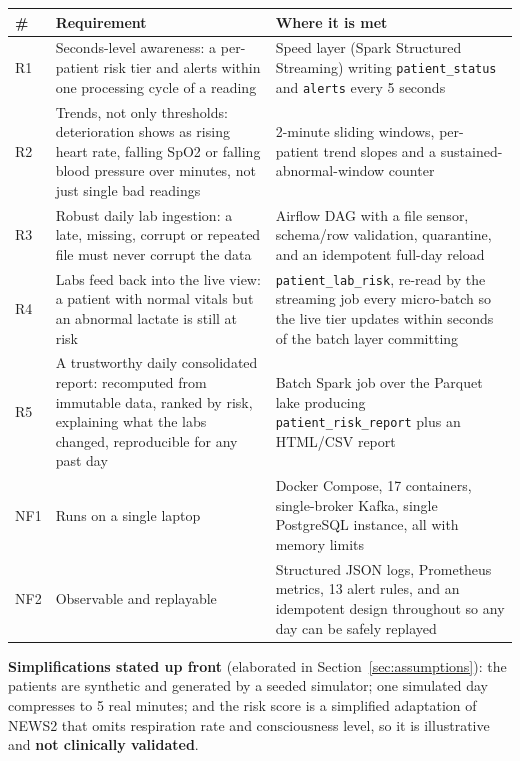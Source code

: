 \documentclass[11pt,a4paper]{article}
\newcommand{\code}[1]{\texttt{\small #1}}
\begin{document}
\begin{longtable}{@{}L{1.2cm}L{6cm}L{7.5cm}@{}}
\toprule
\textbf{\#} & \textbf{Requirement} & \textbf{Where it is met} \\
\midrule
\endhead
R1 & Seconds-level awareness: a per-patient risk tier and alerts within one processing cycle of a reading &
Speed layer (Spark Structured Streaming) writing \code{patient\_status} and \code{alerts} every 5 seconds \\
R2 & Trends, not only thresholds: deterioration shows as rising heart rate, falling SpO2 or falling blood pressure over minutes, not just single bad readings &
2-minute sliding windows, per-patient trend slopes and a sustained-abnormal-window counter \\
R3 & Robust daily lab ingestion: a late, missing, corrupt or repeated file must never corrupt the data &
Airflow DAG with a file sensor, schema/row validation, quarantine, and an idempotent full-day reload \\
R4 & Labs feed back into the live view: a patient with normal vitals but an abnormal lactate is still at risk &
\code{patient\_lab\_risk}, re-read by the streaming job every micro-batch so the live tier updates within seconds of the batch layer committing \\
R5 & A trustworthy daily consolidated report: recomputed from immutable data, ranked by risk, explaining what the labs changed, reproducible for any past day &
Batch Spark job over the Parquet lake producing \code{patient\_risk\_report} plus an HTML/CSV report \\
NF1 & Runs on a single laptop &
Docker Compose, 17 containers, single-broker Kafka, single PostgreSQL instance, all with memory limits \\
NF2 & Observable and replayable &
Structured JSON logs, Prometheus metrics, 13 alert rules, and an idempotent design throughout so any day can be safely replayed \\
\bottomrule
\end{longtable}

\textbf{Simplifications stated up front} (elaborated in Section~\ref{sec:assumptions}): the patients
are synthetic and generated by a seeded simulator; one simulated day compresses to 5 real minutes;
and the risk score is a simplified adaptation of NEWS2 that omits respiration rate and consciousness
level, so it is illustrative and \textbf{not clinically validated}.

\end{document}
